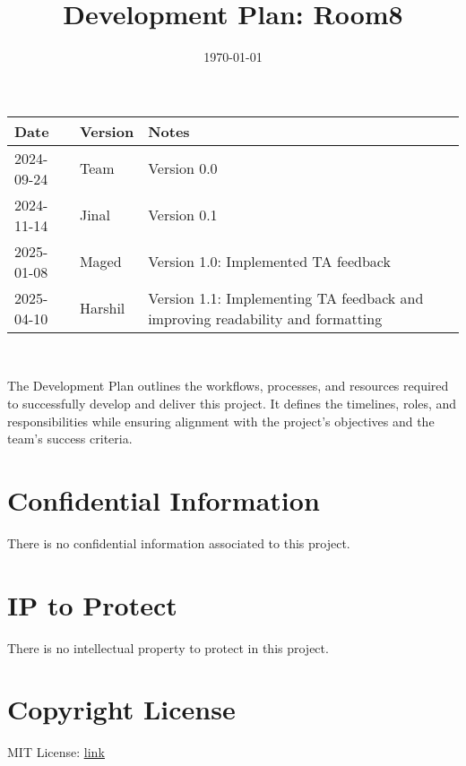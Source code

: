 \documentclass[12pt, titlepage]{article}
\begin{document}
\title{Development Plan: Room8} 
\author{\authname}
\date{\today}
	
\maketitle



\begin{tabularx}{\textwidth}{p{3cm}p{2cm}X}
\toprule {\bf Date} & {\bf Version} & {\bf Notes}\\
\midrule
2024-09-24 & Team & Version 0.0 \\
2024-11-14 & Jinal & Version 0.1 \\
2025-01-08 & Maged & Version 1.0: Implemented TA feedback \\
2025-04-10 & Harshil & Version 1.1: Implementing TA feedback and improving readability and formatting\\
\bottomrule
\end{tabularx}

~\newpage


The Development Plan outlines the workflows, processes, and resources required to successfully develop and deliver this project. It defines the timelines, roles, and responsibilities while ensuring alignment with the project’s objectives and the team's success criteria.

\section{Confidential Information}
There is no confidential information associated to this project.

\section{IP to Protect}
There is no intellectual property to protect in this project.

\section{Copyright License}
MIT License: \href{https://github.com/jinalkast/room8/blob/main/LICENSE}{\underline{link}} 
\end{document}
